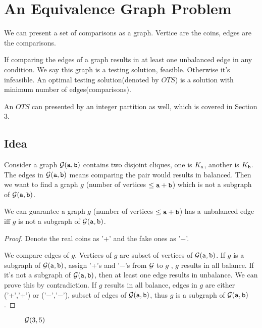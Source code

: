 \section{An Equivalence Graph Problem}


We can present a set of comparisons as a graph. Vertice are the coins, edges are the comparisons.


\begin{definition}
If comparing the edges of a graph results in at least one unbalanced edge in any condition.
We say this graph is a testing solution, feasible. Otherwise it's infeasible.
An optimal testing solution(denoted by $OTS$) is a solution with minimum number of edges(comparisons).
\end{definition}

An $OTS$ can presented by an integer partition as well, which is covered in Section 3.

\subsection*{Idea}
Consider a graph ${\cal G}(\mathtt{a},\mathtt{b})$ contains two disjoint cliques, one is $K_{\mathtt{a}}$, another is $K_{\mathtt{b}}$. The edges in ${\cal G}(\mathtt{a},\mathtt{b})$ means comparing the pair would results in balanced. Then we want to find a graph $g$ (number of vertices $\leq \mathtt{a}+\mathtt{b}$) which is not a subgraph of ${\cal G}(\mathtt{a},\mathtt{b})$.

\begin{lemma}
We can guarantee a graph $g$ (number of vertices $\leq \mathtt{a}+\mathtt{b}$) has a unbalanced edge iff $g$ is not a subgraph of ${\cal G}(\mathtt{a},\mathtt{b})$.
\end{lemma}

\begin{proof}

Denote the real coins as '+' and the fake ones as '$-$'. 

We compare edges of $g$. Vertices of $g$ are subset of vertices of ${\cal G}(\mathtt{a},\mathtt{b})$.
If $g$ is a subgraph of ${\cal G}(\mathtt{a},\mathtt{b})$, assign '+'s and '$-$'s from ${\cal G}$ to $g$ , $g$ results in all balance.
If it's not a subgraph of ${\cal G}(\mathtt{a},\mathtt{b})$, then at least one edge results in unbalance. We can prove this by contradiction. If $g$ results in all balance, edges in $g$ are either ('+','+') or ('$-$','$-$'), subset of edges of ${\cal G}(\mathtt{a},\mathtt{b})$, thus $g$ is a subgraph of ${\cal G}(\mathtt{a},\mathtt{b})$.
\end{proof}

\begin{figure}[H]
  \centering
  
  \caption{${\cal G}(3,5)$}
\end{figure}

